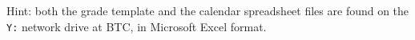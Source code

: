 
Hint: both the grade template and the calendar spreadsheet files are found on the {\tt Y:} network drive at BTC, in Microsoft Excel format.











